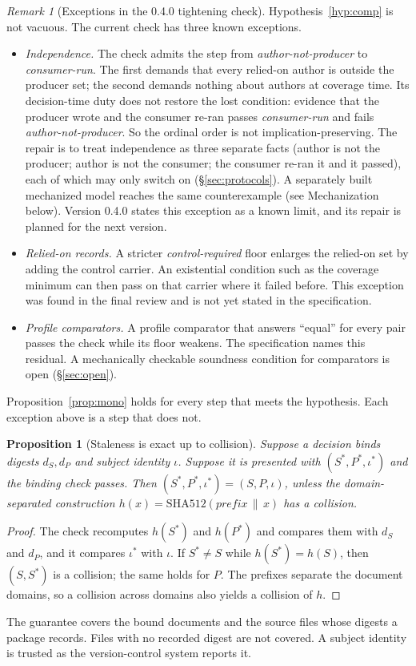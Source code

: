 \documentclass[11pt]{article}
\newtheorem{proposition}{Proposition}
\theoremstyle{definition}
\theoremstyle{remark}
\newtheorem{remark}{Remark}
\begin{document}
\begin{remark}[Exceptions in the 0.4.0 tightening check]\label{rem:indep}
Hypothesis~\ref{hyp:comp} is not vacuous. The current check has three known exceptions.
\begin{itemize}[itemsep=1pt]
\item \emph{Independence.} The check admits the step from \emph{author-not-producer} to
  \emph{consumer-run}. The first demands that every relied-on author is outside the producer set;
  the second demands nothing about authors at coverage time. Its decision-time duty does not
  restore the lost condition: evidence that the producer wrote and the consumer re-ran passes
  \emph{consumer-run} and fails \emph{author-not-producer}. So the ordinal order is not
  implication-preserving. The repair is to treat independence as three separate facts (author is
  not the producer; author is not the consumer; the consumer re-ran it and it passed), each of
  which may only switch on (§\ref{sec:protocols}). A separately built mechanized model reaches the
  same counterexample (see Mechanization below). Version 0.4.0 states this exception as a known
  limit, and its repair is planned for the next version.
\item \emph{Relied-on records.} A stricter \emph{control-required} floor enlarges the relied-on set
  by adding the control carrier. An existential condition such as the coverage minimum can then
  pass on that carrier where it failed before. This exception was found in the final review and is
  not yet stated in the specification.
\item \emph{Profile comparators.} A profile comparator that answers ``equal'' for every pair
  passes the check while its floor weakens. The specification names this residual. A mechanically
  checkable soundness condition for comparators is open (§\ref{sec:open}).
\end{itemize}
Proposition~\ref{prop:mono} holds for every step that meets the hypothesis. Each exception above is
a step that does not.
\end{remark}

\begin{proposition}[Staleness is exact up to collision]\label{prop:stale}
Suppose a decision binds digests $d_S, d_P$ and subject identity $\iota$. Suppose it is presented
with $(S^*,P^*,\iota^*)$ and the binding check passes. Then $(S^*,P^*,\iota^*)=(S,P,\iota)$, unless
the domain-separated construction $h(x)=\mathrm{SHA512}(\mathit{prefix}\,\|\,x)$ has a collision.
\end{proposition}
\begin{proof}
The check recomputes $h(S^*)$ and $h(P^*)$ and compares them with $d_S$ and $d_P$, and it compares
$\iota^*$ with $\iota$. If $S^*\neq S$ while $h(S^*)=h(S)$, then $(S,S^*)$ is a collision; the same
holds for $P$. The prefixes separate the document domains, so a collision across domains also
yields a collision of $h$.
\end{proof}
\noindent The guarantee covers the bound documents and the source files whose digests a package
records. Files with no recorded digest are not covered. A subject identity is trusted as the
version-control system reports it.
\end{document}
